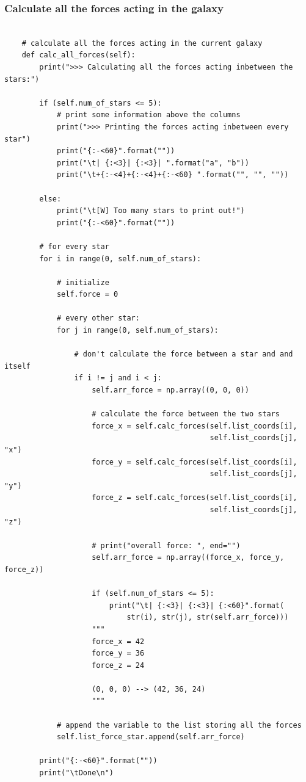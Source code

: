 \subsubsection{Calculate all the forces acting in the galaxy}

\begin{lstlisting}

    # calculate all the forces acting in the current galaxy
    def calc_all_forces(self):
        print(">>> Calculating all the forces acting inbetween the stars:")

        if (self.num_of_stars <= 5):
            # print some information above the columns
            print(">>> Printing the forces acting inbetween every star")
            print("{:-<60}".format(""))
            print("\t| {:<3}| {:<3}| ".format("a", "b"))
            print("\t+{:-<4}+{:-<4}+{:-<60} ".format("", "", ""))

        else:
            print("\t[W] Too many stars to print out!")
            print("{:-<60}".format(""))

        # for every star
        for i in range(0, self.num_of_stars):

            # initialize
            self.force = 0

            # every other star:
            for j in range(0, self.num_of_stars):

                # don't calculate the force between a star and and itself
                if i != j and i < j:
                    self.arr_force = np.array((0, 0, 0))

                    # calculate the force between the two stars
                    force_x = self.calc_forces(self.list_coords[i],
                                               self.list_coords[j], "x")
                    force_y = self.calc_forces(self.list_coords[i],
                                               self.list_coords[j], "y")
                    force_z = self.calc_forces(self.list_coords[i],
                                               self.list_coords[j], "z")

                    # print("overall force: ", end="")
                    self.arr_force = np.array((force_x, force_y, force_z))

                    if (self.num_of_stars <= 5):
                        print("\t| {:<3}| {:<3}| {:<60}".format(
                            str(i), str(j), str(self.arr_force)))
                    """
                    force_x = 42
                    force_y = 36
                    force_z = 24

                    (0, 0, 0) --> (42, 36, 24)
                    """

            # append the variable to the list storing all the forces
            self.list_force_star.append(self.arr_force)

        print("{:-<60}".format(""))
        print("\tDone\n")

\end{lstlisting}

